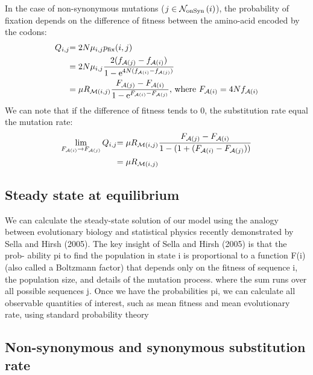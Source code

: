 In the case of non-synonymous mutations (${j} \in \mathcal{N}_{\mathrm{onSyn}}\left({i}\right) $), the probability of fixation depends on the difference of fitness between the amino-acid encoded by the codons:
\begin{align}
{Q_{{i}, {j}}} & { = 2 N \mu_{{i}, {j}} p_{\mathrm{fix}}}({i}, {j}) \nonumber \\
& { = 2 N \mu_{{i}, {j}} }  \dfrac{2({f_{\mathcal{A}({j})} - f_{\mathcal{A}({i})}})}{{1 - \mathrm{e}^{4N(f_{\mathcal{A}({i})} - f_{\mathcal{A}({j})})} }} \nonumber \\
& { = \mu R_{\mathcal{M}({i}, {j})} }  \dfrac{{F_{\mathcal{A}({j})} - F_{\mathcal{A}({i})}}}{{1 - \mathrm{e}^{F_{\mathcal{A}({i})} - F_{\mathcal{A}({j})}} }}\text{, where } F_{\mathcal{A}({i})} = 4N f_{\mathcal{A}({i})}
\end{align}
We can note that if the difference of fitness tends to $0$, the substitution rate equal the mutation rate:
\begin{align}
\lim_{F_{\mathcal{A}({i})} \to F_{\mathcal{A}({j})}} {Q_{{i}, {j}}} & { = \mu R_{\mathcal{M}({i}, {j})} }  \dfrac{{F_{\mathcal{A}({j})} - F_{\mathcal{A}({i})}}}{{1 - (1  + (F_{\mathcal{A}({i})} - F_{\mathcal{A}({j})})) }} \nonumber \\
& { =  \mu R_{\mathcal{M}({i}, {j})} } 
\end{align}

\subsection{Steady state at equilibrium}
\citet{McCandlish2014}
We can calculate the steady-state solution of our model using the
analogy between evolutionary biology and statistical
physics recently demonstrated by Sella and Hirsh
(2005). The
key insight of Sella and Hirsh (2005) is that the prob-
ability pi to find the population in state i is proportional
to a function F(i) (also called a Boltzmann factor) that
depends only on the fitness of sequence i, the population size, and details of the mutation process.
where the sum runs over all possible sequences j.
Once we have the probabilities pi, we can calculate all observable quantities of interest, such as mean fitness and mean
evolutionary rate, using standard probability theory 

\subsection{Non-synonymous and synonymous substitution rate} 

